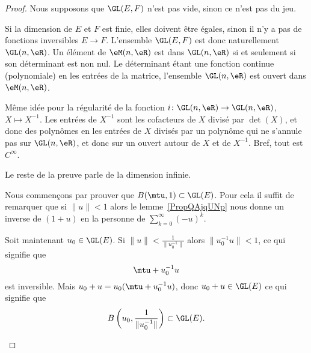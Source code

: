 \begin{proof}
	Nous supposons que \( \GL(E,F)\) n'est pas vide, sinon ce n'est pas du jeu.
	\begin{subproof}


		Si la dimension de \( E\) et \( F\) est finie, elles doivent être égales, sinon il n'y a pas de fonctions inversibles \( E\to F\). L'ensemble \( \GL(E,F)\) est donc naturellement \( \GL(n,\eR)\). Un élément de \( \eM(n,\eR)\) est dans \( \GL(n,\eR)\) si et seulement si son déterminant est non nul. Le déterminant étant une fonction continue (polynomiale) en les entrées de la matrice, l'ensemble \( \GL(n,\eR)\) est ouvert dans \( \eM(n,\eR)\).

		Même idée pour la régularité de la fonction \( i\colon \GL(n,\eR)\to \GL(n,\eR)\), \( X\mapsto X^{-1}\). Les entrées de \( X^{-1}\) sont les cofacteurs de \( X\) divisé par \( \det(X)\), et donc des polynômes en les entrées de \( X\) divisés par un polynôme qui ne s'annule pas sur \( \GL(n,\eR)\), et donc sur un ouvert autour de \( X\) et de \( X^{-1}\). Bref, tout est \(  C^{\infty}\).

		Le reste de la preuve parle de la dimension infinie.


		Nous commençons par prouver que \( B(\mtu,1)\subset \GL(E)\). Pour cela il suffit de remarquer que si \( \| u \|<1\) alors le lemme~\ref{PropQAjqUNp} nous donne un inverse de \( (1+u)\) en la personne de \( \sum_{k=0}^{\infty}(-u)^k\).


		Soit maintenant \( u_0\in\GL(E)\). Si \( \| u \|<\frac{1}{ \| u_0^{-1} \| }\) alors \( \| u_0^{-1}u \|<1\), ce qui signifie que
		\begin{equation}
			\mtu+u_0^{-1}u
		\end{equation}
		est inversible. Mais \( u_0+u=u_0(\mtu+u_0^{-1}u)\), donc \( u_0+u\in\GL(E)\) ce qui signifie que
		\begin{equation}
			B\left( u_0,\frac{1}{ \| u_0^{-1} \| } \right)\subset \GL(E).
		\end{equation}



\end{subproof}
\end{proof}
